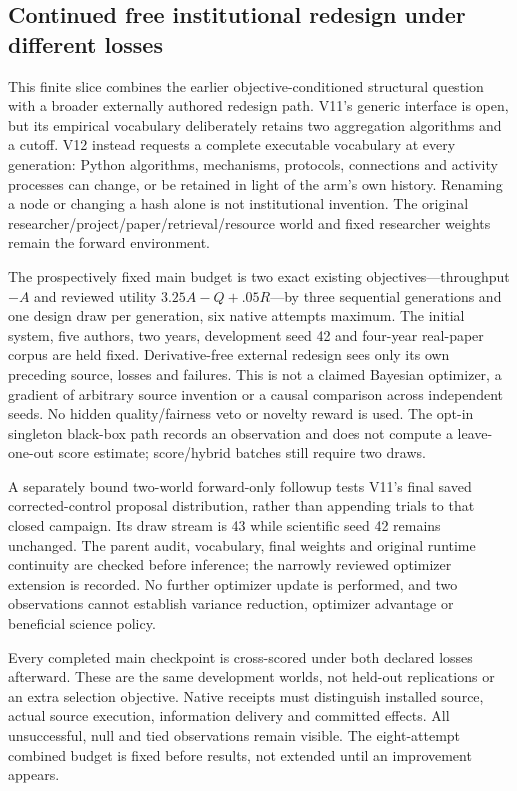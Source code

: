 \subsection{Continued free institutional redesign under different losses}
\label{sec:native-objective-redesign-v12}

This finite slice combines the earlier objective-conditioned structural
question with a broader externally authored redesign path. V11's generic
interface is open, but its empirical vocabulary deliberately retains two
aggregation algorithms and a cutoff. V12 instead requests a complete executable
vocabulary at every generation: Python algorithms, mechanisms, protocols,
connections and activity processes can change, or be retained in light of the
arm's own history. Renaming a node or changing a hash alone is not institutional
invention. The original researcher/project/paper/retrieval/resource world and
fixed researcher weights remain the forward environment.

The prospectively fixed main budget is two exact existing objectives---throughput
$-A$ and reviewed utility $3.25A-Q+.05R$---by three sequential generations and
one design draw per generation, six native attempts maximum. The initial
system, five authors, two years, development seed 42 and four-year real-paper
corpus are held fixed. Derivative-free external redesign sees only its own
preceding source, losses and failures. This is not a claimed Bayesian optimizer,
a gradient of arbitrary source invention or a causal comparison across
independent seeds. No hidden quality/fairness veto or novelty reward is used.
The opt-in singleton black-box path records an observation and does not compute
a leave-one-out score estimate; score/hybrid batches still require two draws.

A separately bound two-world forward-only followup tests V11's final saved
corrected-control proposal distribution, rather than appending trials to that
closed campaign. Its draw stream is 43 while scientific seed 42 remains unchanged.
The parent audit, vocabulary, final weights and original runtime continuity are
checked before inference; the narrowly reviewed optimizer extension is recorded.
No further optimizer update is performed, and two observations cannot establish variance
reduction, optimizer advantage or beneficial science policy.

Every completed main checkpoint is cross-scored under both declared losses
afterward. These are the same development worlds, not held-out replications or
an extra selection objective. Native receipts must distinguish installed source,
actual source execution, information delivery and committed effects. All
unsuccessful, null and tied observations remain visible. The eight-attempt
combined budget is fixed before results, not extended until an improvement
appears.

